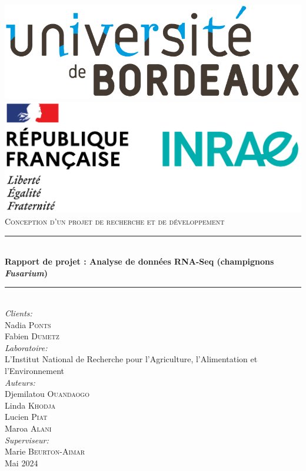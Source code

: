 \documentclass{report}
\begin{document}
\begin{titlepage}
\newcommand{\HRule}{\rule{\linewidth}{0.5mm}}
\newcommand{\reportyear}{Mai 2024}
\center

\includegraphics[scale=0.3]{img/logo_ub.png}\\[0.5cm] 
\includegraphics[scale=0.4]{img/logo_inrae.PNG}\\[1cm]

\textsc{\Large Conception d'un projet de recherche et de développement}\\[0.5cm]
\HRule \\[0.4cm]
{ \huge \bfseries Rapport de projet : Analyse de données RNA-Seq (champignons \textit{Fusarium})}\\[0.3cm]
\HRule \\[0.8cm]

\Large \emph{Clients:}\\
Nadia \textsc{Ponts}\\
Fabien \textsc{Dumetz}\\[0.8cm]

\Large \emph{Laboratoire:}\\
L’Institut National de Recherche pour l’Agriculture, l’Alimentation et l’Environnement\\[0.8cm]

\Large \emph{Auteurs:}\\
Djemilatou \textsc{Ouandaogo}\\
Linda \textsc{Khodja}\\
Lucien \textsc{Piat}\\
Maroa \textsc{Alani}\\[0.8cm]

\Large \emph{Superviseur:}\\
 Marie \textsc{Beurton-Aimar}\\[1cm]
 
\reportyear
\vfill
\end{titlepage}
\end{document}
